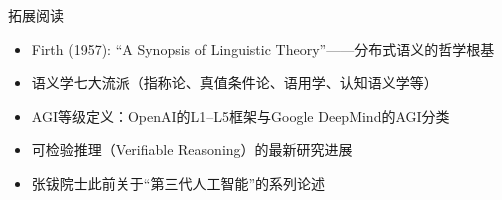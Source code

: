 \documentclass[a4paper]{article}
\begin{document}
\begin{knowledgebox}{拓展阅读}
\begin{itemize}
\item Firth (1957): ``A Synopsis of Linguistic Theory''——分布式语义的哲学根基
\item 语义学七大流派（指称论、真值条件论、语用学、认知语义学等）
\item AGI等级定义：OpenAI的L1--L5框架与Google DeepMind的AGI分类
\item 可检验推理（Verifiable Reasoning）的最新研究进展
\item 张钹院士此前关于``第三代人工智能''的系列论述
\end{itemize}
\end{knowledgebox}

\end{document}
